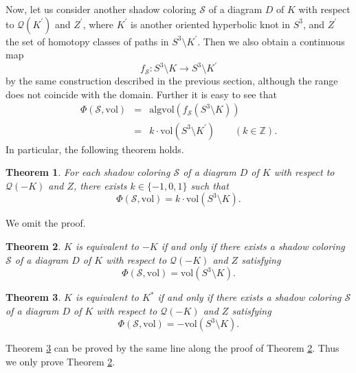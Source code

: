 \documentclass[12pt]{amsart}
\newtheorem{theorem}{Theorem}[section]
\theoremstyle{definition}
\begin{document}
Now, let us consider another shadow coloring $\mathcal{S}$ of a diagram $D$ of $K$ with respect to $\mathcal{Q}(K^{\prime})$ and $Z^{\prime}$, where $K^{\prime}$ is another oriented hyperbolic knot in $S^{3}$, and $Z^{\prime}$ the set of homotopy classes of paths in $S^{3} \setminus K^{\prime}$.
Then we also obtain a continuous map
\[
 f_{\mathcal{S}} : S^{3} \setminus K \longrightarrow S^{3} \setminus K^{\prime}
\]
by the same construction described in the previous section, although the range does not coincide with the domain.
Further it is easy to see that
\begin{eqnarray*}
 \Phi(\mathcal{S}, \mathrm{vol}) & = & \mathrm{algvol}(f_{\mathcal{S}}(S^{3} \setminus K)) \\
 & = & k \cdot \mathrm{vol}(S^{3} \setminus K^{\prime}) \qquad (k \in \mathbb{Z}).
\end{eqnarray*}
In particular, the following theorem holds.

\begin{theorem}\label{thm:orientation_reversed}
For each shadow coloring $\mathcal{S}$ of a diagram $D$ of $K$ with respect to $\mathcal{Q}(-K)$ and $Z$, there exists $k \in \{ -1, 0, 1 \}$ such that
\[
 \Phi(\mathcal{S}, \mathrm{vol}) = k \cdot \mathrm{vol}(S^{3} \setminus K).
\]
\end{theorem}

\noindent
We omit the proof.

\begin{theorem}\label{thm:invertibility}
$K$ is equivalent to $-K$ if and only if there exists a shadow coloring $\mathcal{S}$ of a diagram $D$ of $K$ with respect to $\mathcal{Q}(-K)$ and $Z$ satisfying
\[
 \Phi(\mathcal{S}, \mathrm{vol}) = \mathrm{vol}(S^{3} \setminus K).
\]
\end{theorem}

\begin{theorem}\label{thm:positive_amphichirality}
$K$ is equivalent to $K^{\ast}$ if and only if there exists a shadow coloring $\mathcal{S}$ of a diagram $D$ of $K$ with respect to $\mathcal{Q}(-K)$ and $Z$ satisfying
\[
 \Phi(\mathcal{S}, \mathrm{vol}) = - \mathrm{vol}(S^{3} \setminus K).
\]
\end{theorem}

\noindent
Theorem \ref{thm:positive_amphichirality} can be proved by the same line along the proof of Theorem \ref{thm:invertibility}.
Thus we only prove Theorem \ref{thm:invertibility}.
\end{document}
